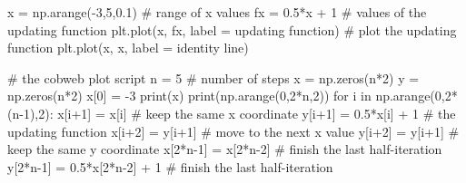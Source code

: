 \documentclass[
  letterpaper,
  DIV=11,
  numbers=noendperiod]{scrreprt}
\newenvironment{Shaded}{\begin{snugshade}}{\end{snugshade}}
\newcommand{\BuiltInTok}[1]{\textcolor[rgb]{0.00,0.23,0.31}{#1}}
\newcommand{\CommentTok}[1]{\textcolor[rgb]{0.37,0.37,0.37}{#1}}
\newcommand{\ControlFlowTok}[1]{\textcolor[rgb]{0.00,0.23,0.31}{#1}}
\newcommand{\DecValTok}[1]{\textcolor[rgb]{0.68,0.00,0.00}{#1}}
\newcommand{\FloatTok}[1]{\textcolor[rgb]{0.68,0.00,0.00}{#1}}
\newcommand{\KeywordTok}[1]{\textcolor[rgb]{0.00,0.23,0.31}{#1}}
\newcommand{\NormalTok}[1]{\textcolor[rgb]{0.00,0.23,0.31}{#1}}
\newcommand{\OperatorTok}[1]{\textcolor[rgb]{0.37,0.37,0.37}{#1}}
\newcommand{\StringTok}[1]{\textcolor[rgb]{0.13,0.47,0.30}{#1}}
\begin{document}
\begin{Shaded}
\begin{Highlighting}[]
\NormalTok{x }\OperatorTok{=}\NormalTok{ np.arange(}\OperatorTok{{-}}\DecValTok{3}\NormalTok{,}\DecValTok{5}\NormalTok{,}\FloatTok{0.1}\NormalTok{) }\CommentTok{\# range of x values}
\NormalTok{fx }\OperatorTok{=} \FloatTok{0.5}\OperatorTok{*}\NormalTok{x }\OperatorTok{+} \DecValTok{1} \CommentTok{\# values of the updating function}
\NormalTok{plt.plot(x, fx, label }\OperatorTok{=} \StringTok{\textquotesingle{}updating function\textquotesingle{}}\NormalTok{) }\CommentTok{\# plot the updating function}
\NormalTok{plt.plot(x, x, label }\OperatorTok{=} \StringTok{\textquotesingle{}identity line\textquotesingle{}}\NormalTok{)}

\CommentTok{\# the cobweb plot script}
\NormalTok{n }\OperatorTok{=} \DecValTok{5} \CommentTok{\# number of steps}
\NormalTok{x }\OperatorTok{=}\NormalTok{ np.zeros(n}\OperatorTok{*}\DecValTok{2}\NormalTok{)}
\NormalTok{y }\OperatorTok{=}\NormalTok{ np.zeros(n}\OperatorTok{*}\DecValTok{2}\NormalTok{)}
\NormalTok{x[}\DecValTok{0}\NormalTok{] }\OperatorTok{=} \OperatorTok{{-}}\DecValTok{3}
\BuiltInTok{print}\NormalTok{(x)}
\BuiltInTok{print}\NormalTok{(np.arange(}\DecValTok{0}\NormalTok{,}\DecValTok{2}\OperatorTok{*}\NormalTok{n,}\DecValTok{2}\NormalTok{))}
\ControlFlowTok{for}\NormalTok{ i }\KeywordTok{in}\NormalTok{ np.arange(}\DecValTok{0}\NormalTok{,}\DecValTok{2}\OperatorTok{*}\NormalTok{(n}\OperatorTok{{-}}\DecValTok{1}\NormalTok{),}\DecValTok{2}\NormalTok{):}
\NormalTok{    x[i}\OperatorTok{+}\DecValTok{1}\NormalTok{] }\OperatorTok{=}\NormalTok{ x[i] }\CommentTok{\# keep the same x coordinate}
\NormalTok{    y[i}\OperatorTok{+}\DecValTok{1}\NormalTok{] }\OperatorTok{=} \FloatTok{0.5}\OperatorTok{*}\NormalTok{x[i] }\OperatorTok{+} \DecValTok{1} \CommentTok{\# the updating function}
\NormalTok{    x[i}\OperatorTok{+}\DecValTok{2}\NormalTok{] }\OperatorTok{=}\NormalTok{ y[i}\OperatorTok{+}\DecValTok{1}\NormalTok{] }\CommentTok{\# move to the next x value}
\NormalTok{    y[i}\OperatorTok{+}\DecValTok{2}\NormalTok{] }\OperatorTok{=}\NormalTok{ y[i}\OperatorTok{+}\DecValTok{1}\NormalTok{] }\CommentTok{\# keep the same y coordinate}
\NormalTok{x[}\DecValTok{2}\OperatorTok{*}\NormalTok{n}\OperatorTok{{-}}\DecValTok{1}\NormalTok{] }\OperatorTok{=}\NormalTok{ x[}\DecValTok{2}\OperatorTok{*}\NormalTok{n}\OperatorTok{{-}}\DecValTok{2}\NormalTok{] }\CommentTok{\# finish the last half{-}iteration}
\NormalTok{y[}\DecValTok{2}\OperatorTok{*}\NormalTok{n}\OperatorTok{{-}}\DecValTok{1}\NormalTok{] }\OperatorTok{=} \FloatTok{0.5}\OperatorTok{*}\NormalTok{x[}\DecValTok{2}\OperatorTok{*}\NormalTok{n}\OperatorTok{{-}}\DecValTok{2}\NormalTok{] }\OperatorTok{+} \DecValTok{1} \CommentTok{\# finish the last half{-}iteration}


\end{Highlighting}
\end{Shaded}
\end{document}
